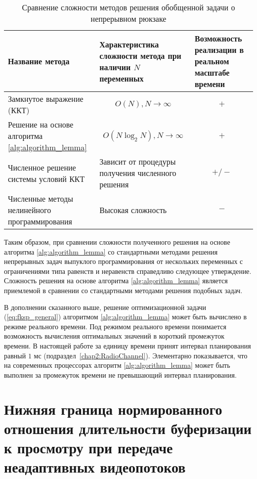 \begin{table}[!h]
    \caption{Сравнение сложности методов решения обобщенной задачи о непрерывном рюкзаке}
    \begin{center}
		\label{tab:nonadaptiveComplexity}
	    \begin{tabular}{| C{5cm} | C{5cm} | C{5cm} |}
	    	\hline
	    	Название метода & Характеристика сложности метода при наличии $N$ переменных & Возможность реализации в реальном масштабе времени\\
	    	\hline
			Замкнутое выражение (ККТ) & $$O(N), N\to\infty$$ & $$+$$\\
	    	\hline
			Решение на основе алгоритма \ref{alg:algorithm_lemma} & $$O(N \log_2 N), N\to\infty$$ & $$+$$\\
	    	\hline
	    	Численное решение системы условий ККТ & Зависит от процедуры получения численного решения & $$+/-$$ \\
	    	\hline
	    	Численные методы нелинейного программирования & Высокая сложность & $$-$$ \\
	    	\hline
    	\end{tabular}
	\end{center}
\end{table}

Таким образом, при сравнении сложности полученного решения на основе алгоритма \ref{alg:algorithm_lemma} со стандартными методами решения непрерывных задач выпуклого программирования от нескольких переменных с ограничениями типа равенств и неравенств справедливо следующее утверждение. Сложность решения на основе алгоритма \ref{alg:algorithm_lemma} является приемлемой в сравнении со стандартными методами решения подобных задач.

В дополнении сказанного выше, решение оптимизационной задачи (\ref{eq:fksp_general}) алгоритмом \ref{alg:algorithm_lemma} может быть вычислено в режиме реального времени. Под режимом реального времени понимается возможность вычисления оптимальных значений в короткий промежуток времени. В настоящей работе за единицу времени принят интервал планирования равный $1$ мс (подраздел~\ref{chap2:RadioChannel}). Элементарно показывается, что на современных процессорах алгоритм \ref{alg:algorithm_lemma} может быть выполнен за промежуток времени не превышающий интервал планирования.

\section{Нижняя граница нормированного отношения длительности буферизации к просмотру при передаче неадаптивных видеопотоков}
\label{chap3:LowerBoundForG}

